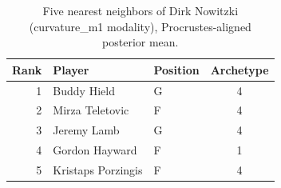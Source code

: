 \begin{table}[htbp]
  \centering\small
  \begin{tabular}{rllc}
    \toprule
    Rank & Player & Position & Archetype \\
    \midrule
    1 & Buddy Hield & G & 4 \\
    2 & Mirza Teletovic & F & 4 \\
    3 & Jeremy Lamb & G & 4 \\
    4 & Gordon Hayward & F & 1 \\
    5 & Kristaps Porzingis & F & 4 \\
    \bottomrule
  \end{tabular}
  \caption{Five nearest neighbors of Dirk Nowitzki (curvature_m1 modality), Procrustes-aligned posterior mean.}
  \label{tab:Dirk_Nowitzki_neighbors_curvature_m1}
\end{table}

